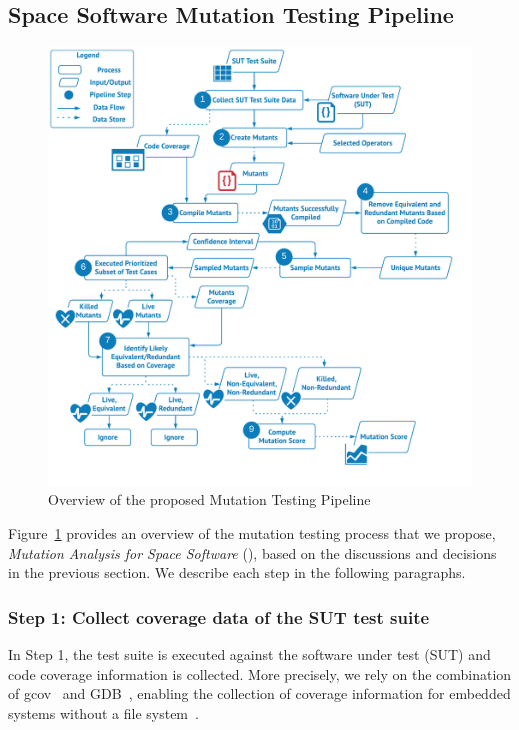 \subsection{Space Software Mutation Testing Pipeline}
\label{sec:approach}

\begin{figure}[tb]
\begin{center}
\includegraphics[width=13cm]{images/MT}
\caption{Overview of the proposed Mutation Testing Pipeline}
\label{fig:approach}
\end{center}
\end{figure}

Figure~\ref{fig:approach} provides an overview of the mutation testing process that we propose, 
\emph{Mutation Analysis for Space Software} (\APPR), based on the discussions and decisions in the previous section. We describe each step in the following paragraphs. 

\subsubsection{Step 1: Collect coverage data of the SUT test suite}

In Step 1, the test suite is executed against the software under test (SUT) and code coverage information is collected. 
More precisely, we rely on the combination of gcov~\cite{GCOV}
and GDB~\cite{GDB}, enabling the collection of coverage information for embedded systems without a file system~\cite{THANASSIS}.

